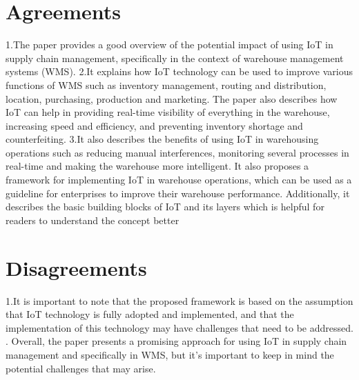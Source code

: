 \documentclass[12pt,letterpaper]{article}
\begin{document}
\section{Agreements}
    1.The paper provides a good overview of the potential impact of using IoT in supply chain management, specifically in the context of warehouse management systems (WMS).\newline
    2.It explains how IoT technology can be used to improve various functions of WMS such as inventory management, routing and distribution, location, purchasing, production and marketing. The paper also describes how IoT can help in providing real-time visibility of everything in the warehouse, increasing speed and efficiency, and preventing inventory shortage and counterfeiting. \newline 
    3.It also describes the benefits of using IoT in warehousing operations such as reducing manual interferences, monitoring several processes in real-time and making the warehouse more intelligent. It also proposes a framework for implementing IoT in warehouse operations, which can be used as a guideline for enterprises to improve their warehouse performance. Additionally, it describes the basic building blocks of IoT and its layers which is helpful for readers to understand the concept better
\section{Disagreements}
    1.It is important to note that the proposed framework is based on the assumption that IoT technology is fully adopted and implemented, and that the implementation of this technology may have challenges that need to be addressed. . Overall, the paper presents a promising approach for using IoT in supply chain management and specifically in WMS, but it's important to keep in mind the potential challenges that may arise.\newline







\newcommand{\doi}[1]{\href{https://doi.org/#1}{https://doi.org/#1}} %
\end{document}
